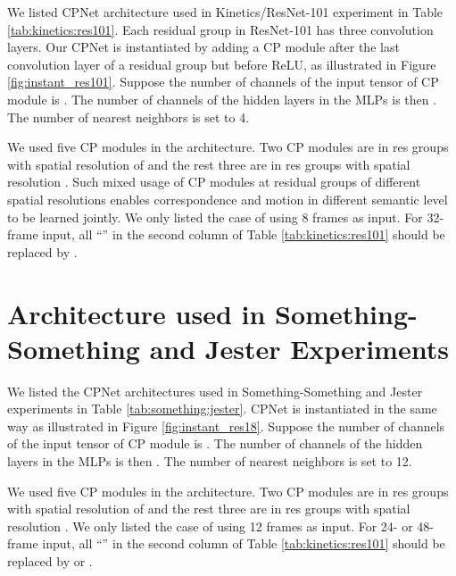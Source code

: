 \documentclass[10pt,twocolumn,letterpaper]{article}
\begin{document}
We listed CPNet architecture used in Kinetics/ResNet-101 experiment in Table \ref{tab:kinetics:res101}. Each residual group in ResNet-101 has three convolution layers. Our CPNet is instantiated by adding a CP module after the last convolution layer of a residual group but before ReLU, as  illustrated in Figure \ref{fig:instant_res101}. 
Suppose the number of channels of the input tensor of CP module is . The number of channels of the hidden layers in the MLPs is then . The number of nearest neighbors  is set to 4.

We used five CP modules in the architecture. Two CP modules are in res groups with spatial resolution of  and the rest three are in res groups with spatial resolution . Such mixed usage of CP modules at residual groups of different spatial resolutions enables correspondence and motion in different semantic level to be learned jointly. We only listed the case of using 8 frames as input. For 32-frame input, all ``'' in the second column of Table \ref{tab:kinetics:res101} should be replaced by .





\section{Architecture used in Something-Something and Jester Experiments}
\label{sec:something:jester}

We listed the CPNet architectures used in Something-Something \cite{Something:Something} and Jester \cite{Jester} experiments in Table \ref{tab:something:jester}. CPNet is instantiated in the same way as illustrated in Figure \ref{fig:instant_res18}. 
Suppose the number of channels of the input tensor of CP module is . The number of channels of the hidden layers in the MLPs is then . The number of nearest neighbors  is set to 12.

We used five CP modules in the architecture. Two CP modules are in res groups with spatial resolution of  and the rest three are in res groups with spatial resolution . We only listed the case of using 12 frames as input. For 24- or 48-frame input, all ``'' in the second column of Table \ref{tab:kinetics:res101} should be replaced by  or .
\end{document}
